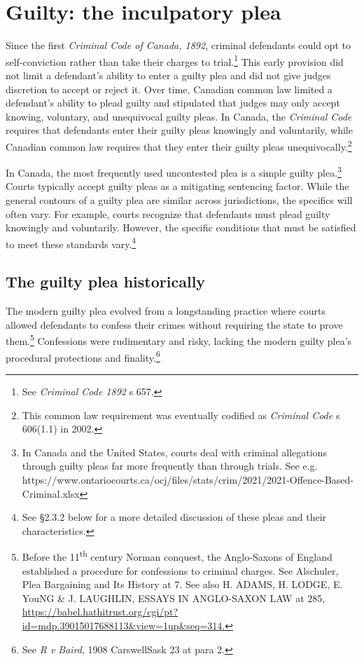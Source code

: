 \section{Guilty: the inculpatory plea}

Since the first \textit{Criminal Code of Canada, 1892}, criminal defendants could opt to self-conviction rather than take their charges to trial.\footnote{See \textit{Criminal Code 1892} s 657.} This early provision did not limit a defendant's ability to enter a guilty plea and did not give judges discretion to accept or reject it. Over time, Canadian common law limited a defendant's ability to plead guilty and stipulated that judges may only accept knowing, voluntary, and unequivocal guilty pleas. In Canada, the \textit{Criminal Code} requires that defendants enter their guilty pleas knowingly and voluntarily, while Canadian common law requires that they enter their guilty pleas unequivocally.\footnote{This common law requirement was eventually codified as \textit{Criminal Code} s 606(1.1) in 2002.}

In Canada, the most frequently used uncontested plea is a simple guilty plea.\footnote{In Canada and the United States, courts deal with criminal allegations through guilty pleas far more frequently than through trials. See e.g. https://www.ontariocourts.ca/ocj/files/stats/crim/2021/2021-Offence-Based-Criminal.xlsx} Courts typically accept guilty pleas as a mitigating sentencing factor. While the general contours of a guilty plea are similar across jurisdictions, the specifics will often vary. For example, courts recognize that defendants must plead guilty knowingly and voluntarily. However, the specific conditions that must be satisfied to meet these standards vary.\footnote{See §2.3.2 below for a more detailed discussion of these pleas and their characteristics.} 

\subsection{The guilty plea historically}

The modern guilty plea evolved from a longstanding practice where courts allowed defendants to confess their crimes without requiring the state to prove them.\footnote{Before the 11\textsuperscript{th} century Norman conquest, the Anglo-Saxons of England established a procedure for confessions to criminal charges. See Alschuler, Plea Bargaining and Its History at 7. See also H. ADAMS, H. LODGE, E. YouNG \& J. LAUGHLIN, ESSAYS IN ANGLO-SAXON LAW at 285, \url{https://babel.hathitrust.org/cgi/pt?id=mdp.39015017688113\&view=1up\&seq=314.}} Confessions were rudimentary and risky, lacking the modern guilty plea's procedural protections and finality.\footnote{See \textit{R v Baird}, 1908 CarswellSask 23 at para 2.}

